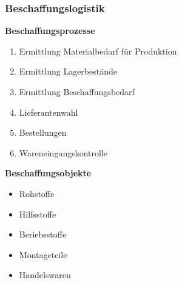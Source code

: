 \documentclass[../ZF_Wing.tex]{subfiles}
\begin{document}
\subsubsection{Beschaffungslogistik}
\colorbox{green!30}{\textbf{Beschaffungsprozesse}}

\begin{enumerate}
	\item Ermittlung Materialbedarf für Produktion
	\item Ermittlung Lagerbestände
	\item Ermittlung Beschaffungsbedarf
	\item Lieferantenwahl
	\item Bestellungen
	\item Wareneingangskontrolle
\end{enumerate}


\colorbox{green!30}{\textbf{Beschaffungsobjekte}}
\begin{itemize}
	\item Rohstoffe
	\item Hilfsstoffe
	\item Beriebsstoffe
	\item Montageteile
	\item Handelswaren
\end{itemize}
\end{document}
